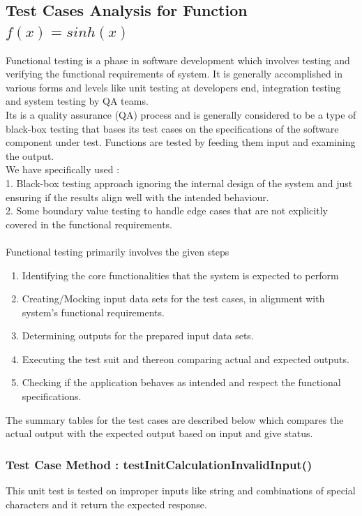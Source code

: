\documentclass[a4paper,11pt]{report}
\begin{document}
\subsection{Test Cases Analysis for Function $f(x)=sinh(x)$}
Functional testing is a phase in software development which involves testing and verifying the functional requirements of system. It is generally accomplished in various forms and levels like unit testing at developers end, integration testing and system testing by QA teams. \\
Its is a quality assurance (QA) process and is generally considered to be a type of black-box testing that bases its test cases on the specifications of the software component under test. Functions are tested by feeding them input and examining the output.\cite{testing}\\
We have specifically used : \\
1. Black-box testing approach ignoring the internal design of the system and just ensuring if the results align well with the intended behaviour.\\
2. Some boundary value testing to handle edge cases that are not explicitly covered in the functional requirements.
\\\\
Functional testing primarily involves the given steps
\begin{enumerate}
    \item Identifying the core functionalities that the system is expected to perform
    \item Creating/Mocking input data sets for the test cases, in alignment with system's functional requirements.
    \item Determining outputs for the prepared input data sets.
    \item Executing the test suit and thereon comparing actual and expected outputs.
    \item Checking if the application behaves as intended and respect the functional specifications.
\end{enumerate}
The summary tables for the test cases are described below which compares the actual output with the expected output based on input and give status.
\subsubsection{Test Case Method : testInitCalculationInvalidInput()}
This unit test is tested on improper inputs like string and combinations of special characters and it return the expected response.
\end{document}
